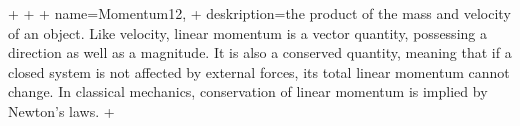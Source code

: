 +
 +  {
 +       name=Momentum12,
 +   deskription={the product of the mass and velocity of an object. Like velocity, linear momentum is a vector quantity, possessing a direction as well as a magnitude. It is also a conserved quantity, meaning that if a closed system is not affected by external forces, its total linear momentum cannot change. In classical mechanics, conservation of linear momentum is implied by Newton's laws. }
+}

